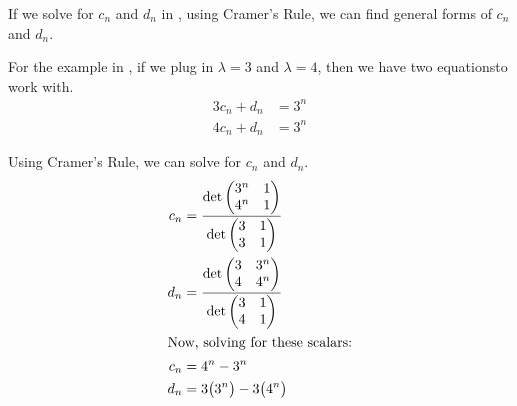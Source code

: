 If we solve for $c_{n}$ and $d_{n}$ in , using Cramer's Rule, we can find general forms of $c_{n}$ and $d_{n}$.

For the example in , if we plug in $\lambda = 3$ and $\lambda = 4$, then we have two equationsto work with.
\begin{align*}
  3 c_{n} + d_{n} &= 3^{n} \\
  4c_{n} + d_{n} &= 3^{n}
\end{align*}

Using Cramer's Rule, we can solve for $c_{n}$ and $d_{n}$.
\begin{align*}
  c_{n} &= \frac{\det
          \begin{pmatrix}
            3^{n} & 1 \\
            4 ^{n} & 1
          \end{pmatrix}}{\det
                     \begin{pmatrix}
                       3 & 1 \\
                       3 & 1
                     \end{pmatrix}} \\
  d_{n} &= \frac{\det
          \begin{pmatrix}
            3 & 3^{n} \\
            4 & 4^{n}
          \end{pmatrix}}{\det
                \begin{pmatrix}
                  3 & 1 \\
                  4 & 1
                \end{pmatrix}
                      } \\
  \shortintertext{Now, solving for these scalars:}
  c_{n} &= 4^{n} - 3^{n} \\
  d_{n} &= 3 \bigl( 3^{n} \bigr) - 3 \bigl( 4^{n} \bigr)
\end{align*}

